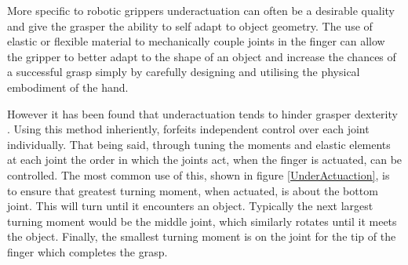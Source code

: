 More specific to robotic grippers underactuation can often be a desirable quality and give the grasper the ability to self adapt to object geometry. The use of elastic or flexible material to mechanically couple joints in the finger can allow the gripper to better adapt to the shape of an object and increase the chances of a successful grasp simply by carefully designing and utilising the physical embodiment of the hand.

However it has been found that underactuation tends to hinder grasper dexterity \cite{RBOHand2}. Using this method inheriently, forfeits independent control over each joint individually. That being said, through tuning the moments and elastic elements at each joint the order in which the joints act, when the finger is actuated, can be controlled. The most common use of this, shown in figure \ref{UnderActuaction}, is to ensure that greatest turning moment, when actuated, is about the bottom joint. This will turn until it encounters an object. Typically the next largest turning moment would be the middle joint, which similarly rotates until it meets the object. Finally, the smallest turning moment is on the joint for the tip of the finger which completes the grasp.

